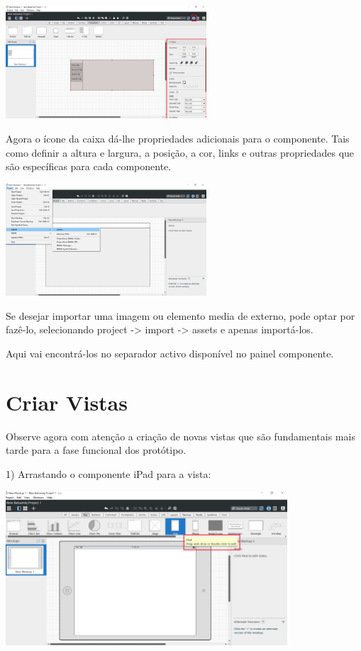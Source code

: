 \documentclass{tufte-book} %
\begin{document}
\begin{center}
	\includegraphics[width=7.50cm]{img9.png}
\end{center}

Agora o ícone da caixa dá-lhe propriedades adicionais para o componente. Tais como definir a altura e largura, a posição, a cor, links e outras propriedades que são específicas para cada componente.

\begin{center}
	\includegraphics[width=7.50cm]{img10.png}
\end{center}

Se desejar importar uma imagem ou elemento media de externo, pode optar por fazê-lo, selecionando project -> import -> assets  e apenas importá-los.

Aqui vai encontrá-los no separador activo disponível no painel componente.

\chapter{Criar Vistas}

Observe agora com atenção a criação de novas vistas que são fundamentais mais tarde para a fase funcional dos protótipo.

1) Arrastando o componente iPad para a vista:

\begin{center}
	\includegraphics[width=10.50cm]{img11.png}
\end{center}
\end{document}
